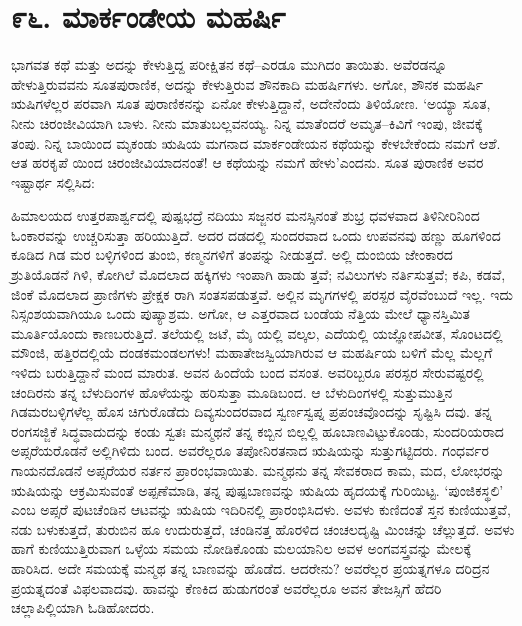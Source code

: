 
\chapter{೯೬. ಮಾರ್ಕಂಡೇಯ ಮಹರ್ಷಿ}

ಭಾಗವತ ಕಥೆ ಮತ್ತು ಅದನ್ನು ಕೇಳುತ್ತಿದ್ದ ಪರೀಕ್ಷಿತನ ಕಥೆ–ಎರಡೂ ಮುಗಿದಂ ತಾಯಿತು. ಅವೆರಡನ್ನೂ ಹೇಳುತ್ತಿರುವವನು ಸೂತಪುರಾಣಿಕ, ಅದನ್ನು ಕೇಳುತ್ತಿರುವ ಶೌನಕಾದಿ ಮಹರ್ಷಿಗಳು. ಅಗೋ, ಶೌನಕ ಮಹರ್ಷಿ ಋಷಿಗಳೆಲ್ಲರ ಪರವಾಗಿ ಸೂತ ಪುರಾಣಿಕನನ್ನು ಏನೋ ಕೇಳುತ್ತಿದ್ದಾನೆ, ಅದೇನೆಂದು ತಿಳಿಯೋಣ. ‘ಅಯ್ಯಾ ಸೂತ, ನೀನು ಚಿರಂಜೀವಿಯಾಗಿ ಬಾಳು. ನೀನು ಮಾತುಬಲ್ಲವನಯ್ಯ. ನಿನ್ನ ಮಾತೆಂದರೆ ಅಮೃತ–ಕಿವಿಗೆ ಇಂಪು, ಜೀವಕ್ಕೆ ತಂಪು. ನಿನ್ನ ಬಾಯಿಂದ ಮೃಕಂಡು ಋಷಿಯ ಮಗನಾದ ಮಾರ್ಕಂಡೇಯನ ಕಥೆಯನ್ನು ಕೇಳಬೇಕೆಂದು ನಮಗೆ ಆಶೆ. ಆತ ಹರಕೃಪೆ ಯಿಂದ ಚಿರಂಜೀವಿಯಾದನಂತೆ! ಆ ಕಥೆಯನ್ನು ನಮಗೆ ಹೇಳು’ಎಂದನು. ಸೂತ ಪುರಾಣಿಕ ಅವರ ಇಷ್ಟಾರ್ಥ ಸಲ್ಲಿಸಿದ:

ಹಿಮಾಲಯದ ಉತ್ತರಪಾರ್ಶ್ವದಲ್ಲಿ ಪುಷ್ಪಭದ್ರೆ ನದಿಯು ಸಜ್ಜನರ ಮನಸ್ಸಿನಂತೆ ಶುಭ್ರ ಧವಳವಾದ ತಿಳಿನೀರಿನಿಂದ ಓಂಕಾರವನ್ನು ಉಚ್ಚರಿಸುತ್ತಾ ಹರಿಯುತ್ತಿದೆ. ಅದರ ದಡದಲ್ಲಿ ಸುಂದರವಾದ ಒಂದು ಉಪವನವು ಹಣ್ಣು ಹೂಗಳಿಂದ ಕೂಡಿದ ಗಿಡ ಮರ ಬಳ್ಳಿಗಳಿಂದ ತುಂಬಿ, ಕಣ್ಮನಗಳಿಗೆ ತಂಪನ್ನು ನೀಡುತ್ತದೆ. ಅಲ್ಲಿ ದುಂಬಿಯ ಜೇಂಕಾರದ ಶ್ರುತಿಯೊಡನೆ ಗಿಳಿ, ಕೋಗಿಲೆ ಮೊದಲಾದ ಹಕ್ಕಿಗಳು ಇಂಪಾಗಿ ಹಾಡು ತ್ತವೆ; ನವಿಲುಗಳು ನರ್ತಿಸುತ್ತವೆ; ಕಪಿ, ಕಡವೆ, ಜಿಂಕೆ ಮೊದಲಾದ ಪ್ರಾಣಿಗಳು ಪ್ರೇಕ್ಷಕ ರಾಗಿ ಸಂತಸಪಡುತ್ತವೆ. ಅಲ್ಲಿನ ಮೃಗಗಳಲ್ಲಿ ಪರಸ್ಪರ ವೈರವೆಂಬುದೆ ಇಲ್ಲ. ಇದು ನಿಸ್ಸಂಶಯವಾಗಿಯೂ ಒಂದು ಪುಷ್ಯಾಶ್ರಮ. ಅಗೋ, ಆ ಎತ್ತರವಾದ ಬಂಡೆಯ ನೆತ್ತಿಯ ಮೇಲೆ ಧ್ಯಾನಸ್ತಿಮಿತ ಮೂರ್ತಿಯೊಂದು ಕಾಣಬರುತ್ತಿದೆ. ತಲೆಯಲ್ಲಿ ಜಟೆ, ಮೈ ಯಲ್ಲಿ ವಲ್ಕಲ, ಎದೆಯಲ್ಲಿ ಯಜ್ಞೋಪವೀತ, ಸೊಂಟದಲ್ಲಿ ಮೌಂಜಿ, ಹತ್ತಿರದಲ್ಲಿಯೆ ದಂಡಕಮಂಡಲಗಳು! ಮಹಾತೇಜಸ್ವಿಯಾಗಿರುವ ಆ ಮಹರ್ಷಿಯ ಬಳಿಗೆ ಮೆಲ್ಲ ಮೆಲ್ಲಗೆ ಇಳಿದು ಬರುತ್ತಿದ್ದಾನೆ ಮಂದ ಮಾರುತ. ಅವನ ಹಿಂದೆಯೆ ಬಂದ ವಸಂತ. ಅವರಿಬ್ಬರೂ ಪರಸ್ಪರ ಸೇರುವಷ್ಟರಲ್ಲಿ ಚಂದಿರನು ತನ್ನ ಬೆಳುದಿಂಗಳ ಹೊಳೆಯನ್ನು ಹರಿಸುತ್ತಾ ಮೂಡಿಬಂದ. ಆ ಬೆಳುದಿಂಗಳಲ್ಲಿ ಸುತ್ತುಮುತ್ತಿನ ಗಿಡಮರಬಳ್ಳಿಗಳೆಲ್ಲ ಹೊಸ ಚಿಗುರೊಡೆದು ದಿವ್ಯಸುಂದರವಾದ ಸ್ವರ್ಣಸ್ವಪ್ನ ಪ್ರಪಂಚವೊಂದನ್ನು ಸೃಷ್ಟಿಸಿ ದವು. ತನ್ನ ರಂಗಸಜ್ಜಿಕೆ ಸಿದ್ಧವಾದುದನ್ನು ಕಂಡು ಸ್ವತಃ ಮನ್ಮಥನೆ ತನ್ನ ಕಬ್ಬಿನ ಬಿಲ್ಲಲ್ಲಿ ಹೂಬಾಣವಿಟ್ಟುಕೊಂಡು, ಸುಂದರಿಯರಾದ ಅಪ್ಸರೆಯರೊಡನೆ ಅಲ್ಲಿಗಿಳಿದು ಬಂದ. ಅವರೆಲ್ಲರೂ ತಪೋನಿರತನಾದ ಋಷಿಯನ್ನು ಸುತ್ತುಗಟ್ಟಿದರು. ಗಂಧರ್ವರ ಗಾಯನದೊಡನೆ ಅಪ್ಸರೆಯರ ನರ್ತನ ಪ್ರಾರಂಭವಾಯಿತು. ಮನ್ಮಥನು ತನ್ನ ಸೇವಕರಾದ ಕಾಮ, ಮದ, ಲೋಭರನ್ನು ಋಷಿಯನ್ನು ಆಕ್ರಮಿಸುವಂತೆ ಅಪ್ಪಣೆಮಾಡಿ, ತನ್ನ ಪುಷ್ಪಬಾಣವನ್ನು ಋಷಿಯ ಹೃದಯಕ್ಕೆ ಗುರಿಯಿಟ್ಟ. ‘ಪುಂಜಿಕಸ್ಥಲಿ’ ಎಂಬ ಅಪ್ಸರೆ ಪುಟಚೆಂಡಿನ ಆಟವನ್ನು ಋಷಿಯ ಇದಿರಿನಲ್ಲಿ ಪ್ರಾರಂಭಿಸಿದಳು. ಅವಳು ಕುಣಿದಂತೆ ಸ್ತನ ಕುಣಿಯುತ್ತವೆ, ನಡು ಬಳುಕುತ್ತದೆ, ತುರುಬಿನ ಹೂ ಉದುರುತ್ತದೆ, ಚಂಡಿನತ್ತ ಹೊರಳಿದ ಚಂಚಲದೃಷ್ಟಿ ಮಿಂಚನ್ನು ಚೆಲ್ಲುತ್ತದೆ. ಅವಳು ಹಾಗೆ ಕುಣಿಯುತ್ತಿರುವಾಗ ಒಳ್ಳೆಯ ಸಮಯ ನೋಡಿಕೊಂಡು ಮಲಯಾನಿಲ ಅವಳ ಅಂಗವಸ್ತ್ರವನ್ನು ಮೇಲಕ್ಕೆ ಹಾರಿಸಿದ. ಅದೇ ಸಮಯಕ್ಕೆ ಮನ್ಮಥ ತನ್ನ ಬಾಣವನ್ನು ಹೊಡೆದ. ಆದರೇನು? ಅವರೆಲ್ಲರ ಪ್ರಯತ್ನಗಳೂ ದರಿದ್ರನ ಪ್ರಯತ್ನದಂತೆ ವಿಫಲವಾದವು. ಹಾವನ್ನು ಕೆಣಕಿದ ಹುಡುಗರಂತೆ ಅವರೆಲ್ಲರೂ ಅವನ ತೇಜಸ್ಸಿಗೆ ಹೆದರಿ ಚಲ್ಲಾಪಿಲ್ಲಿಯಾಗಿ ಓಡಿಹೋದರು.

